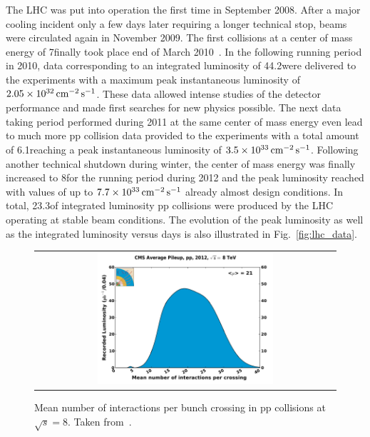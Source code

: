 The LHC was put into operation the first time in September 2008. After a major cooling incident only a few days later requiring a longer technical stop, beams were circulated again in November 2009. The first collisions at a center of mass energy of 7\tev finally took place end of March 2010~\cite{bib:lhcmachineoutreach}. In the following running period in 2010, data corresponding to an integrated luminosity of 44.2\pbinv were delivered to the experiments with a maximum peak instantaneous luminosity of $2.05 \times 10^{32} \,\text{cm}^{-2} \,\text{s}^{-1}$. These data allowed intense studies of the detector performance and made first searches for new physics possible. The next data taking period performed during 2011 at the same center of mass energy even lead to much more pp collision data provided to the experiments with a total amount of 6.1\fbinv reaching a peak instantaneous luminosity of $3.5 \times 10^{33} \,\text{cm}^{-2} \,\text{s}^{-1}$. Following another technical shutdown during winter, the center of mass energy was finally increased to 8\tev for the running period during 2012 and the peak luminosity reached with values of up to $7.7 \times 10^{33} \,\text{cm}^{-2} \,\text{s}^{-1}$ already almost design conditions. In total, 23.3\fbinv of integrated luminosity pp collisions were produced by the LHC operating at stable beam conditions. The evolution of the peak luminosity as well as the integrated luminosity versus days is also illustrated in Fig.~\ref{fig:lhc_data}. \\
\begin{figure}[!tp]
  \centering
  \begin{tabular}{c}
    \includegraphics[width=0.6\textwidth]{figures/pileup_pp_2012.pdf} 
  \end{tabular}
  \caption{Mean number of interactions per bunch crossing in pp collisions at $\sqrt{s} = 8$\tev. Taken from~\cite{bib:lhc:lumi12}.}
  \label{fig:lhc_pileup}
\end{figure}
